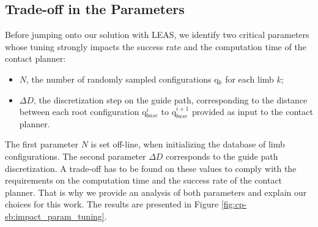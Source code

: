 \subsection{Trade-off in the Parameters \label{subsub:cp-sb:tradeoff}}

Before jumping onto our solution with LEAS, we identify two critical parameters whose tuning strongly impacts the success rate and the computation time of the contact planner:
\begin{itemize}
    \item $N$, the number of randomly sampled configurations q$_k$ for each limb $k$;
    \item $\Delta D$, the discretization step on the guide path, corresponding to the distance between each root configuration q$_{base}^i$ to q$_{base}^{i+1}$ provided as input to the contact planner. 
\end{itemize}
The first parameter $N$ is set off-line, when initializing the database of limb configurations. The second parameter $\Delta D$ corresponds to the guide path discretization. 
A trade-off has to be found on these values to comply with the requirements on the computation time and the success rate of the contact planner.%
That is why we provide an analysis of both parameters and explain our choices for this work. The results are presented in Figure \ref{fig:cp-sb:impact_param_tuning}.

